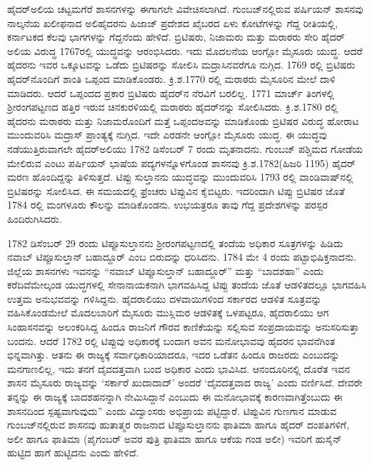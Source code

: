ಹೈದರ್​ಅಲಿಯ ಚಟ್ಟಮಗೆರೆ ಶಾಸನಗಳನ್ನು ಈಗಾಗಲೇ ವಿವೇಚಿಸಲಾಗಿದೆ. ಗುಂಬಜ್​ನಲ್ಲಿರುವ ಪರ್ಷಿಯನ್​ ಶಾಸನವು ನಾಲ್ಕನೆಯ ಖಲೀಫನಾದ ಅಲಿಹೈದರನು ಹಿಜಾಜ್​ ಪ್ರದೇಶದ ಖೈಬರದ ಏಳು ಕೋಟೆಗಳನ್ನು ಗೆದ್ದ ರೀತಿಯಲ್ಲಿ, ಕರ್ನಾಟಕದ ಕೆಲವು ಭಾಗಗಳನ್ನು ಗೆದ್ದನೆಂದು ಹೇಳಿದೆ. ಬ್ರಿಟಿಷರು, ನಿಜಾಮರು ಮತ್ತು ಮರಾಠರು ಸೇರಿ ಹೈದರ್​ ಅಲಿಯ ವಿರುದ್ಧ 1767ರಲ್ಲಿ ಯುದ್ಧವನ್ನು ಆರಂಭಿಸಿದರು. ಇದು ಮೊದಲನೆಯ ಆಂಗ್ಲೋ ಮೈಸೂರು ಯುದ್ಧ. ಆದರೆ ಹೈದರನು ಇವರ ಒಕ್ಕೂಟವನ್ನು ಒಡೆದು ಬ್ರಿಟಿಷರನ್ನು ಸೋಲಿಸಿ ಮದ್ರಾಸಿನವರೆಗೂ ನುಗ್ಗಿದ. 1769 ರಲ್ಲಿ ಬ್ರಿಟಿಷರು ಹೈದರ್​ನೊಂದಿಗೆ ಶಾಂತಿ ಒಪ್ಪಂದ ಮಾಡಿಕೊಂಡರು. ಕ್ರಿ.ಶ.1770 ರಲ್ಲಿ ಮರಾಠರು ಮೈಸೂರಿನ ಮೇಲೆ ದಾಳಿ ಮಾಡಿದರು. ಆದರೆ ಒಪ್ಪಂದದ ಪ್ರಕಾರ ಬ್ರಿಟಿಷರು ಹೈದರ್​ನ ನೆರವಿಗೆ ಬರಲಿಲ್ಲ. 1771 ಮಾರ್ಚ್ ತಿಂಗಳಲ್ಲಿ ಶ‍್ರೀರಂಗಪಟ್ಟಣದ ಹತ್ತಿರ ಇರುವ ಚಿನಕುರಳಿಯಲ್ಲಿ ಮರಾಠರು ಹೈದರ್​ನನ್ನು ಸೋಲಿಸಿದರು. ಕ್ರಿ.ಶ.1780 ರಲ್ಲಿ ಹೈದರನು ಮರಾಠರು ಮತ್ತು ನಿಜಾಮರೊಂದಿಗೆ ಮತ್ತೆ ಒಪ್ಪಂದಅವನ್ನು ಮಾಡಿಕೊಂಡು ಬ್ರಿಟಿಷರ ವಿರುದ್ಧ ಹೋರಾಟ ಮುಂದುವರಿಸಿ ಮದ್ರಾಸ್​ ಪ್ರಾಂತ್ಯಕ್ಕೆ ನುಗ್ಗಿದ. ಇದೇ ಎರಡನೇ ಆಂಗ್ಲೋ ಮೈಸೂರು ಯುದ್ಧ. ಈ ಯುದ್ಧವು ನಡೆಯುತ್ತಿರುವಾಗಲೇ ಹೈದರ್​ಅಲಿಯು 1782 ಡಿಸೆಂಬರ್​ 7 ರಂದು ಮೃತನಾದನು. ಗುಂಬಜ್​ ಪಶ್ಚಿಮದ ಗೋಡೆಯ ಮೇಲಿರುವ ಎಂಟು ಪರ್ಷಿಯನ್​ ಭಾಷೆಯ ಪದ್ಯಗಳನ್ನೊಳಗೊಂಡ ಶಾಸನವು ಕ್ರಿ.ಶ.1782(ಹಿಜರಿ 1195) ಹೈದರ್​ ಮರಣ ಹೊಂದಿದ್ದನ್ನು ತಿಳಿಸುತ್ತದೆ. ಟಿಪ್ಪು ಸುಲ್ತಾನನು ಯುದ್ಧವನ್ನು ಮುಂದುವರಿಸಿ 1793 ರಲ್ಲಿ ವಾಂಡಿವಾಷ್​ನಲ್ಲಿ ಬ್ರಿಟಿಷರನ್ನು ಸೋಲಿಸಿದ. ಈ ಸಮಯದಲ್ಲಿ ಫ್ರೆಂಚರು ಟಿಪ್ಪುವಿನ ಕೈಬಿಟ್ಟರು. ಇದರಿಂದಾಗಿ ಟಿಪ್ಪು ಬ್ರಿಟಿಷರ ಜೊತೆ 1784 ರಲ್ಲಿ ಮಂಗಳೂರು ಕೌಲನ್ನು ಮಾಡಿಕೊಂಡನು. ಉಭಯತ್ರರೂ ತಾವು ಗೆದ್ದ ಪ್ರದೇಶಗಳನ್ನು ಪರಸ್ಪರ ಹಿಂದಿರುಗಿಸಿದರು. 

1782 ಡಿಸೆಂಬರ್​ 29 ರಂದು ಟಿಪ್ಪೂಸುಲ್ತಾನನು ಶ‍್ರೀರಂಗಪಟ್ಟಣದಲ್ಲಿ ತಂದೆಯ ಅಧಿಕಾರ ಸೂತ್ರಗಳನ್ನು ಹಿಡಿದು ನವಾಬ್​ ಟಿಪ್ಪೂಸುಲ್ತಾನ್​ ಬಹಾದ್ದೂರ್​ ಎಂಬ ಬಿರುದನ್ನು ಧರಿಸಿದನು. 1784 ಮೇ 4 ರಂದು ಪಟ್ಟಾಭಿಷಿಕ್ತನಾದನು. ಜಿಲ್ಲೆಯ ಶಾಸನಗಳು ಇವನನ್ನು “ನವಾಬ್​ ಟಿಪ್ಪೂಸುಲ್ತಾನ್​ ಬಹಾದ್ದೂರ್​” ಮತ್ತು “ಬಾದಶಹಾ” ಎಂದು ಕರೆದಿವೆಮೇಲ್ಕಂಡ ಯುದ್ಧಗಳಲ್ಲಿ ಸೇನಾನಾಯಕನಾಗಿ ಭಾಗವಹಿಸಿದ್ದ ಟಿಪ್ಪು ತಂದೆಯ ಜೊತೆ ಆಡಳಿತದಲ್ಲೂ ಭಾಗವಹಿಸಿ ಉತ್ತಮ ಅನುಭವವನ್ನು ಗಳಿಸಿದ್ದನು. ಹೈದರಾಲಿಯು ದಳವಾಯಿಗಳಿಂದ ಸರ್ಕಾರದ ಆಡಳಿತ ಸೂತ್ರವನ್ನು ವಹಿಸಿಕೊಂಡಮೇಲೆ ಮೊದಲಬಾರಿಗೆ ಮೈಸೂರು ಮುಸ್ಲಿಮರ ಆಡಳಿತಕ್ಕೆ ಒಳಪಟ್ಟರೂ, ಹೈದರಾಲಿಯು ಆಗ ಸಿಂಹಾಸನವನ್ನು ಅಲಂಕರಿಸಿದ್ದ ಹಿಂದೂ ರಾಜನಿಗೆ ಗೌರವ ಕಾಣಿಕೆಯನ್ನು ಸಲ್ಲಿಸುವ ಸಂಪ್ರದಾಯವನ್ನು ಅನುಸರಿಸುತ್ತಾ ಬಂದನು. ಆದರೆ 1782 ರಲ್ಲಿ ಟಿಪ್ಪುವು ಅಧಿಕಾರಕ್ಕೆ ಬಂದಾಗ ಅವನ ಮನೋಭಾವವು ಹೈದರನ ಭಾವನೆಗಿಂತ ಭಿನ್ನವಾಗಿತ್ತು. ಆತನು ಈ ರಾಜ್ಯಕ್ಕೆ ಸರ್ವಾಧಿಕಾರಿಯಾದರೂ, ಇದರ ಒಡೆತನ ಹಿಂದೂ ರಾಜರದು ಎಂಬುದನ್ನು ಮನಗಾಣಲಿಲ್ಲ, ಇದು ತನಗೆ ದೈವದತ್ತವಾಗಿ ಬಂದ ಅಧಿಕಾರ ಎಂದು ಭಾವಿಸಿದ. ಆನಂದೂರಿನಲ್ಲಿ ದೊರೆತ ಇವನ ಶಾಸನ ಮೈಸೂರು ರಾಜ್ಯವನ್ನು ‘ಸರ್ಕಾರೆ ಖುದಾದಾದ್​’ ಅಂದರೆ ‘ದೈವದತ್ತವಾದ ರಾಜ್ಯ’ ಎಂದು ವರ್ಣಿಸಿದೆ. ದೇವರೇ ತನ್ನನ್ನು ಈ ರಾಜ್ಯಕ್ಕೆ ಬಾದಶಹನನ್ನಾಗಿ ನೇಮಿಸಿದ್ದಾನೆ ಎಂಬುದು ಈ ಮನೋಭಾವಕ್ಕೆ ಕಾರಣವಾಗಿತ್ತೆಂಬುದು ಈ ಶಾಸನದಿಂದ ಸ್ಪಷ್ಟವಾಗುವುದು” ಎಂದು ವಿದ್ವಾಂಸರು ಅಭಿಪ್ರಾಯ ಪಟ್ಟಿದ್ದಾರೆ. ಟಿಪ್ಪುವಿನ ಗುಣಗಾನ ಮಾಡುವ ಗುಂಬಜ್​ನಲ್ಲಿರುವ ಶಾಸನವು ಹುತಾತ್ಮರ ರಾಜನಾದ ಟಿಪ್ಪೂಸುಲ್ತಾನನು ಫಾತಿಮಾ ಹಾಗೂ ಹೈದರ್​ ದಂಪತಿಗಳಿಗೆ, ಅಲೀ ಹಾಗೂ ಫಾತಿಮಾ (ಪೈಗಂಬರ್​ ಅವರ ಪುತ್ರಿ ಫಾತಿಮಾ ಹಾಗೂ ಆಕೆಯ ಗಂಡ ಅಲೀ) ಇವರಿಗೆ ಹುಸೈನ್​ ಹುಟ್ಟಿದ ಹಾಗೆ ಹುಟ್ಟಿದನು ಎಂದು ಹೇಳಿದೆ.


